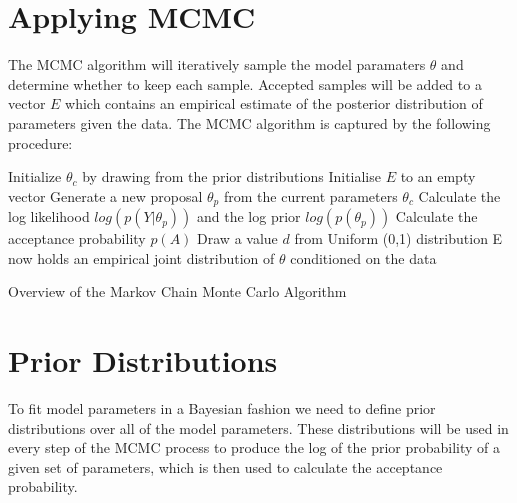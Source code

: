 \documentclass[12pt,a4paper]{article}
\numberwithin{equation}{section}
\begin{document}
\section{Applying MCMC}

The MCMC algorithm will iteratively sample the model paramaters $\theta$ and determine whether to keep
each sample. Accepted samples will be added to a vector $E$ which contains an empirical estimate of the
posterior distribution of parameters given the data. The MCMC algorithm is captured by the following 
procedure:

%

\begin{algorithm}[ht]
 Initialize $\theta_c$ by drawing from the prior distributions\;
 Initialise $E$ to an empty vector\;
  {
  Generate a new proposal $\theta_p$ from the current parameters $\theta_c$\;
  Calculate the log likelihood $log(p(Y|\theta_p))$ and the log prior $log(p(\theta_p))$\;
  Calculate the acceptance probability $p(A)$\;
  Draw a value $d$ from Uniform (0,1) distribution\; 
 }
 E now holds an empirical joint distribution of $\theta$ conditioned on the data\;
 \caption{Overview of the Markov Chain Monte Carlo Algorithm}
\end{algorithm}


\section{Prior Distributions}

To fit model parameters in a Bayesian fashion we need to define prior distributions over all
of the model parameters. These distributions will be used in every step of the MCMC process
to produce the log of the prior probability of a given set of parameters, which is then used 
to calculate the acceptance probability.
\end{document}
